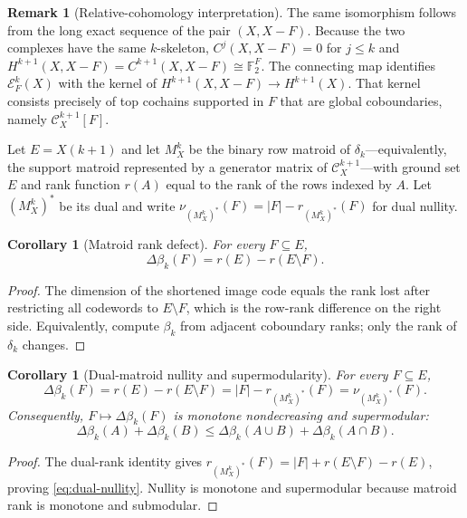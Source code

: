 \documentclass[11pt,letterpaper]{article}
\theoremstyle{plain}
\newtheorem{corollary}[theorem]{Corollary}
\theoremstyle{definition}
\newtheorem{remark}[theorem]{Remark}
\newcommand{\F}{\mathbb{F}_2}
\newcommand{\cC}{\mathcal{C}}
\newcommand{\cE}{\mathcal{E}}
\newcommand{\1}{\mathbf{1}}
\newcommand{\abs}[1]{\left|#1\right|}
\begin{document}
\begin{remark}[Relative-cohomology interpretation]\label{rem:relative}
The same isomorphism follows from the long exact sequence of the pair $(X,X-F)$.
Because the two complexes have the same $k$-skeleton,
$C^j(X,X-F)=0$ for $j\le k$ and
$H^{k+1}(X,X-F)=C^{k+1}(X,X-F)\cong\F^F$.
The connecting map identifies $\cE_F^k(X)$ with the kernel of
$H^{k+1}(X,X-F)\to H^{k+1}(X)$.  That kernel consists precisely of top cochains
supported in $F$ that are global coboundaries, namely $\cC_X^{k+1}[F]$.
\end{remark}

Let $E=X(k+1)$ and let $M_X^k$ be the binary row matroid of $\delta_k$---equivalently,
the support matroid represented by a generator matrix of $\cC_X^{k+1}$---with ground
set $E$ and rank function $r(A)$ equal to the rank of the rows indexed by $A$.  Let
$(M_X^k)^*$ be its dual and write
$\nu_{(M_X^k)^*}(F)=\abs F-r_{(M_X^k)^*}(F)$ for dual nullity.

\begin{corollary}[Matroid rank defect]\label{cor:rank-defect}
For every $F\subseteq E$,
\begin{equation}\label{eq:rank-defect}
 \Delta\beta_k(F)=r(E)-r(E\setminus F).
\end{equation}
\end{corollary}

\begin{proof}
The dimension of the shortened image code equals the rank lost after restricting all
codewords to $E\setminus F$, which is the row-rank difference on the right side.
Equivalently, compute $\beta_k$ from adjacent coboundary ranks; only the rank of
$\delta_k$ changes.
\end{proof}

\begin{corollary}[Dual-matroid nullity and supermodularity]
\label{cor:submodularity}
For every $F\subseteq E$,
\begin{equation}\label{eq:dual-nullity}
 \Delta\beta_k(F)
 =r(E)-r(E\setminus F)
 =\abs F-r_{(M_X^k)^*}(F)
 =\nu_{(M_X^k)^*}(F).
\end{equation}
Consequently, $F\mapsto\Delta\beta_k(F)$ is monotone nondecreasing and supermodular:
\[
 \Delta\beta_k(A)+\Delta\beta_k(B)
 \le \Delta\beta_k(A\cup B)+\Delta\beta_k(A\cap B).
\]
\end{corollary}

\begin{proof}
The dual-rank identity gives
$r_{(M_X^k)^*}(F)=\abs F+r(E\setminus F)-r(E)$, proving
\eqref{eq:dual-nullity}.  Nullity is monotone and supermodular because matroid rank is
monotone and submodular.
\end{proof}
\end{document}
